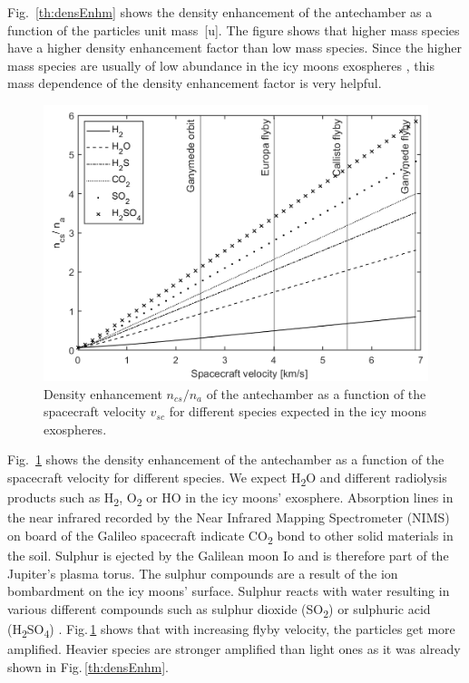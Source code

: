 	Fig.~\ref{th:densEnhm} shows the density enhancement of the antechamber as a function of the particles unit mass~[u]. The figure shows that higher mass species have a higher density enhancement factor than low mass species. Since the higher mass species are usually of low abundance in the icy moons exospheres \cite{Vorburger2015,Vorburger_2018}, this mass dependence of the density enhancement factor is very helpful.\\
	\begin{figure}[h!] %
		\centering
		\includegraphics[width= .7\textwidth]{Bilder/velocityV1.png}
		\caption{Density enhancement $n_{cs}/n_a$ of the antechamber as a function of the spacecraft velocity $v_{sc}$ for different species expected in the icy moons exospheres.}
		\label{th:densEnhvelo}
	\end{figure}
	Fig.~\ref{th:densEnhvelo} shows the density enhancement of the antechamber as a function of the spacecraft velocity for different species. We expect H\textsubscript{2}O and different radiolysis products such as H\textsubscript{2}, O\textsubscript{2} or HO in the icy moons' exosphere. Absorption lines in the near infrared recorded by the Near Infrared Mapping Spectrometer (NIMS) on board of the Galileo spacecraft indicate CO\textsubscript{2} bond to other solid materials in the soil. Sulphur is ejected by the Galilean moon Io and is therefore part of the Jupiter's plasma torus. The sulphur compounds are a result of the ion bombardment on the icy moons' surface. Sulphur reacts with water resulting in various different compounds such as sulphur dioxide (SO\textsubscript{2}) or sulphuric acid (H\textsubscript{2}SO\textsubscript{4}) \cite{Collins_2014}. Fig.\,\ref{th:densEnhvelo} shows that with increasing flyby velocity, the particles get more amplified. Heavier species are stronger amplified than light ones as it was already shown in Fig.\,\ref{th:densEnhm}.\\
